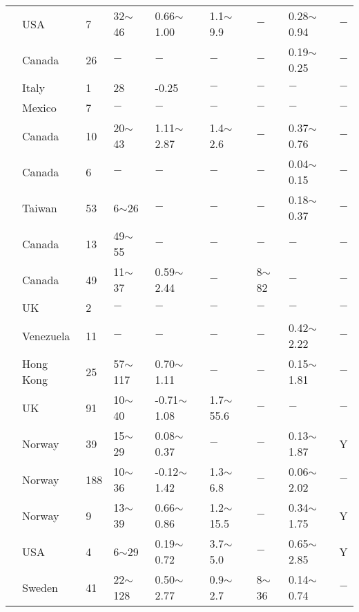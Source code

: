 {\begin{longtable}{lllllllll}
    \citet{Leathers1978250} & USA   & 7     & 32$\sim$46 & 0.66$\sim$1.00 & 1.1$\sim$9.9 & $-$     & 0.28$\sim$0.94 & $-$ \\
    \citet{Lefebvre1987476} & Canada & 26    & $-$     & $-$     & $-$     & $-$     & 0.19$\sim$0.25 & $-$ \\
    \citet{LemboFazio1984115} & Italy & 1     & 28    & -0.25 & $-$     & $-$     & $-$     & $-$ \\
    \citet{Leon1977193} & Mexico & 7     & $-$     & $-$     & $-$     & $-$     & $-$     & $-$ \\
    \citet{Leroueil1983477} & Canada & 10    & 20$\sim$43 & 1.11$\sim$2.87 & 1.4$\sim$2.6 & $-$     & 0.37$\sim$0.76 & $-$ \\
    \citet{Lew1981} & Canada & 6     & $-$     & $-$     & $-$     & $-$     & 0.04$\sim$0.15 & $-$ \\
    \citet{Liu1999} & Taiwan & 53    & 6$\sim$26  & $-$     & $-$     & $-$     & 0.18$\sim$0.37 & $-$ \\
    \citet{Lo19631} & Canada & 13    & 49$\sim$55 & $-$     & $-$     & $-$     & $-$     & $-$ \\
    \citet{Locat1988799} & Canada & 49    & 11$\sim$37 & 0.59$\sim$2.44 & $-$     & 8$\sim$82  & $-$     & $-$ \\
    \citet{Long20072003} & UK    & 2     & $-$     & $-$     & $-$     & $-$     & $-$     & $-$ \\
    \citet{Lowe1960837} & Venezuela & 11    & $-$     & $-$     & $-$     & $-$     & 0.42$\sim$2.22 & $-$ \\
    \citet{Lumb196825} & Hong Kong & 25    & 57$\sim$117 & 0.70$\sim$1.11 & $-$     & $-$     & 0.15$\sim$1.81 & $-$ \\
    \citet{Lunne1981305} & UK    & 91    & 10$\sim$40 & -0.71$\sim$1.08 & 1.7$\sim$55.6 & $-$     & $-$     & $-$ \\
    \citet{Lunne1985907} & Norway & 39    & 15$\sim$29 & 0.08$\sim$0.37 & $-$     & $-$     & 0.13$\sim$1.87 & Y \\
          & Norway & 188   & 10$\sim$36 & -0.12$\sim$1.42 & 1.3$\sim$6.8 & $-$     & 0.06$\sim$2.02 & $-$ \\
    \citet{Lunne1986714} & Norway & 9     & 13$\sim$39 & 0.66$\sim$0.86 & 1.2$\sim$15.5 & $-$     & 0.34$\sim$1.75 & Y \\
    \citet{Mahar198356} & USA   & 4     & 6$\sim$29  & 0.19$\sim$0.72 & 3.7$\sim$5.0 & $-$     & 0.65$\sim$2.85 & Y \\
    \citet{Massarsch1975266} & Sweden & 41    & 22$\sim$128 & 0.50$\sim$2.77 & 0.9$\sim$2.7 & 8$\sim$36  & 0.14$\sim$0.74 & $-$ \\

\end{longtable}}
